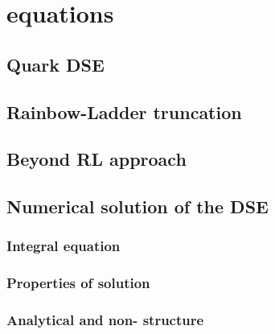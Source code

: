 \chapter{\DS equations}
\label{chap:dse}

\section{Quark DSE}
\section{Rainbow-Ladder truncation}
\section{Beyond RL approach}
\section{Numerical solution of the DSE}
	\subsection{Integral equation}
	\subsection{Properties of solution}
	\subsection{Analytical and non- structure}